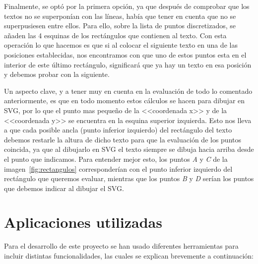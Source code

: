 Finalmente, se optó por la primera opción, ya que después de comprobar que los textos no se superponían con las líneas, había que tener en cuenta que no se superpusiesen entre ellos. Para ello, sobre la lista de puntos discretizados, se añaden las 4 esquinas de los rectángulos que contienen al texto. Con esta operación lo que hacemos es que si al colocar el siguiente texto en una de las posiciones establecidas, nos encontramos con que uno de estos puntos esta en el interior de este último rectángulo, significará que ya hay un texto en esa posición y debemos probar con la siguiente.

Un aspecto clave, y a tener muy en cuenta en la evaluación de todo lo comentado anteriormente, es que en todo momento estos cálculos se hacen para dibujar en SVG, por lo que el punto mas pequeño de la <<coordenada x>> y de la <<coordenada y>> se encuentra en la esquina superior izquierda. Esto nos lleva a que cada posible ancla (punto inferior izquierdo) del rectángulo del texto debemos restarle la altura de dicho texto para que la evaluación de los puntos coincida, ya que al dibujarlo en SVG el texto siempre se dibuja hacia arriba desde el punto que indicamos. Para entender mejor esto, los puntos \textit{A} y \textit{C} de la imagen~\ref{fig:rectangulos} corresponderían con el punto inferior izquierdo del rectángulo que queremos evaluar, mientras que los puntos \textit{B} y \textit{D} serían los puntos que debemos indicar al dibujar el SVG.


\section{Aplicaciones utilizadas}
Para el desarrollo de este proyecto se han usado diferentes herramientas para incluir distintas funcionalidades, las cuales se explican brevemente a continuación:


